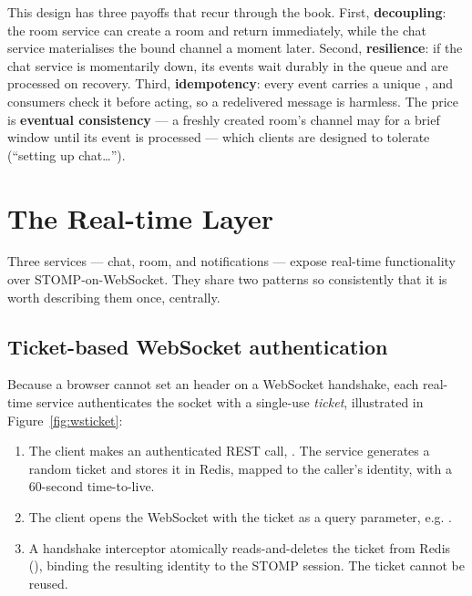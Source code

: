 This design has three payoffs that recur through the book. First,
\textbf{decoupling}: the room service can create a room and return immediately,
while the chat service materialises the bound channel a moment later. Second,
\textbf{resilience}: if the chat service is momentarily down, its events wait
durably in the queue and are processed on recovery. Third, \textbf{idempotency}:
every event carries a unique , and consumers check it before
acting, so a redelivered message is harmless. The price is \textbf{eventual
consistency} --- a freshly created room's channel may  for a brief
window until its event is processed --- which clients are designed to tolerate
(``setting up chat\ldots'').

\section{The Real-time Layer}
\label{sec:realtime-arch}

Three services --- chat, room, and notifications --- expose real-time
functionality over STOMP-on-WebSocket. They share two patterns so consistently
that it is worth describing them once, centrally.

\subsection{Ticket-based WebSocket authentication}

Because a browser cannot set an  header on a WebSocket
handshake, each real-time service authenticates the socket with a single-use
\emph{ticket}, illustrated in Figure~\ref{fig:wsticket}:

\begin{enumerate}
  \item The client makes an authenticated REST call, .
  The service generates a random ticket and stores it in Redis, mapped to the
  caller's identity, with a 60-second time-to-live.
  \item The client opens the WebSocket with the ticket as a query parameter,
  e.g. .
  \item A handshake interceptor atomically reads-and-deletes the ticket from
  Redis (), binding the resulting identity to the STOMP session. The
  ticket cannot be reused.
\end{enumerate}

